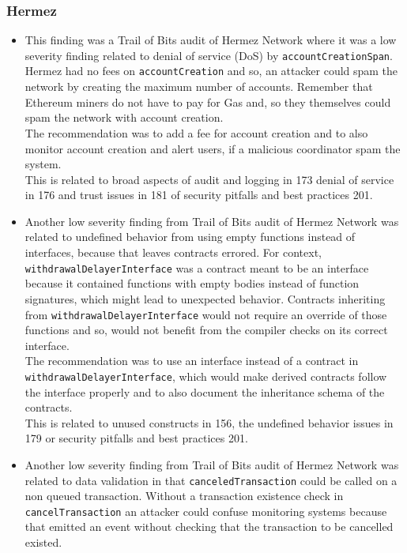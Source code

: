\subsubsection{Hermez}\label{hermez}

\begin{itemize}
\item
  This finding was a Trail of Bits audit of Hermez Network where it was
  a low severity finding related to denial of service (DoS) by
  \texttt{accountCreationSpan}. Hermez had no fees on
  \texttt{accountCreation} and so, an attacker could spam the network by
  creating the maximum number of accounts. Remember that Ethereum miners
  do not have to pay for Gas and, so they themselves could spam the
  network with account creation.\\

  The recommendation was to add a fee for account creation and to also
  monitor account creation and alert users, if a malicious coordinator
  spam the system.\\

  This is related to broad aspects of audit and logging in 173 denial of
  service in 176 and trust issues in 181 of security pitfalls and best
  practices 201.
\item
  Another low severity finding from Trail of Bits audit of Hermez
  Network was related to undefined behavior from using empty functions
  instead of interfaces, because that leaves contracts errored. For
  context, \texttt{withdrawalDelayerInterface} was a contract meant to
  be an interface because it contained functions with empty bodies
  instead of function signatures, which might lead to unexpected
  behavior. Contracts inheriting from
  \texttt{withdrawalDelayerInterface} would not require an override of
  those functions and so, would not benefit from the compiler checks on
  its correct interface.\\

  The recommendation was to use an interface instead of a contract in
  \texttt{withdrawalDelayerInterface}, which would make derived
  contracts follow the interface properly and to also document the
  inheritance schema of the contracts.\\

  This is related to unused constructs in 156, the undefined behavior
  issues in 179 or security pitfalls and best practices 201.
\item
  Another low severity finding from Trail of Bits audit of Hermez
  Network was related to data validation in that
  \texttt{canceledTransaction} could be called on a non queued
  transaction. Without a transaction existence check in
  \texttt{cancelTransaction} an attacker could confuse monitoring
  systems because that emitted an event without checking that the
  transaction to be cancelled existed.\\


\end{itemize}
